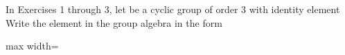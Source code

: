 \documentclass[11pt,oneside]{article}
\begin{document}
\BookNarrativefalse

\begin{BookBody}



\noindent In Exercises 1 through 3, let  be a cyclic group of order 3 with identity element  Write the element in the group algebra  in the form

\begin{center}\begin{adjustbox}{max width=\linewidth}\end{adjustbox}\end{center}

\end{BookBody}

\BookNarrativefalse
\end{document}
